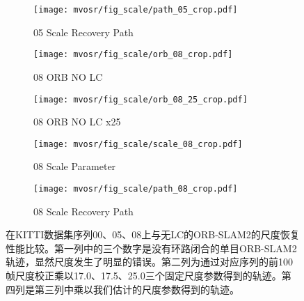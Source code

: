 \begin{figure*}[h]
\begin{subfigure}[t]{0.23\textwidth}
                \texttt{[image: mvosr/fig\_scale/path\_05\_crop.pdf]}
                \label{fig:scaled_path_05}
                \caption{05 Scale Recovery Path}
                \vspace{4pt}
                \end{subfigure}   
    \begin{subfigure}[t]{0.23\textwidth}
        \texttt{[image: mvosr/fig\_scale/orb\_08\_crop.pdf]}
        \label{fig:orb_path_08}
        \caption{08 ORB NO LC}
        \end{subfigure}
        \begin{subfigure}[t]{0.23\textwidth}
            \texttt{[image: mvosr/fig\_scale/orb\_08\_25\_crop.pdf]}
            \label{fig:orb_path_08_25}
            \caption{08 ORB NO LC x25}
            \end{subfigure}
            \begin{subfigure}[t]{0.23\textwidth}
                \texttt{[image: mvosr/fig\_scale/scale\_08\_crop.pdf]}
                \label{fig:scale_08}
                \caption{08 Scale Parameter}
                \end{subfigure}
                \begin{subfigure}[t]{0.23\textwidth}
                    \texttt{[image: mvosr/fig\_scale/path\_08\_crop.pdf]}
                    \label{fig:scaled_path_08}
                    \caption{08 Scale Recovery Path}
                    \end{subfigure}
    \caption{在KITTI数据集序列00、05、08上与无LC的ORB-SLAM2的尺度恢复性能比较。第一列中的三个数字是没有环路闭合的单目ORB-SLAM2轨迹，显然尺度发生了明显的错误。第二列为通过对应序列的前100帧尺度校正乘以17.0、17.5、25.0三个固定尺度参数得到的轨迹。第四列是第三列中乘以我们估计的尺度参数得到的轨迹。}
    \label{fig:scale_recovery}
\end{figure*}
